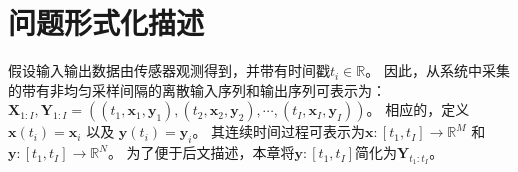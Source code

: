 \section{问题形式化描述}
\label{sec:4_notations}
假设输入输出数据由传感器观测得到，并带有时间戳$t_i\in \mathbb{R}$。
因此，从系统中采集的带有非均匀采样间隔的离散输入序列和输出序列可表示为：
$\boldsymbol X_{1:I},\boldsymbol Y_{1:I}= ((t_1,\boldsymbol x_1,\boldsymbol y_1),(t_2,\boldsymbol x_2, \boldsymbol y_2),\cdots,(t_I,\boldsymbol x_I,\boldsymbol y_I))$。
相应的，定义$\boldsymbol x(t_i)=\boldsymbol x_i$ 以及 $\boldsymbol y(t_i)=\boldsymbol y_i$。
其连续时间过程可表示为$\boldsymbol x:\left[t_{1}, t_{I}\right] \rightarrow \mathbb{R}^{M}$ 和 $\boldsymbol y:\left[t_{1}, t_{I}\right] \rightarrow \mathbb{R}^{N}$。
为了便于后文描述，本章将$\boldsymbol y:\left[t_{1}, t_{I}\right]$简化为$\boldsymbol Y_{t_1:t_I}$。


